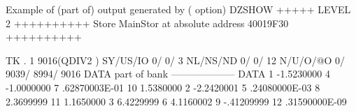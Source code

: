 \begin{Listing}{Example of (part of) output generated by  ( option)}
DZSHOW  +++++ LEVEL     2 ++++++++++            Store  MainStor at absolute address 40019F30      ++++++++++                     
                                                                                                                                 
 TK  .     1     9016(QDIV2   ) SY/US/IO    0/    0/   3 NL/NS/ND    0/    0/      12 N/U/O/@O       0/    9039/    8994/    9016
DATA part of bank                                         --------------------                                                   
DATA      1    -1.5230000         4    -1.0000000         7     .62870003E-01    10     1.5380000                                
          2    -2.2420001         5     .24080000E-03     8     2.3699999        11     1.1650000                                
          3     6.4229999         6     4.1160002         9    -.41209999        12     .31590000E-09                            
\end{Listing}

